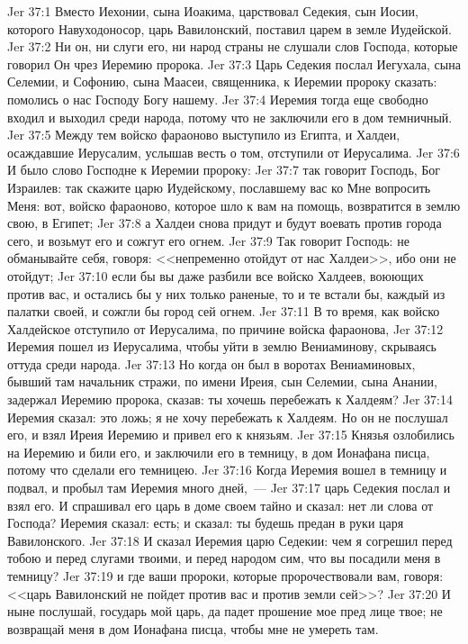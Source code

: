 \vs Jer 37:1 Вместо Иехонии, сына Иоакима, царствовал Седекия, сын Иосии, которого Навуходоносор, царь Вавилонский, поставил царем в земле Иудейской.
\vs Jer 37:2 Ни он, ни слуги его, ни народ страны не слушали слов Господа, которые говорил Он чрез Иеремию пророка.
\vs Jer 37:3 Царь Седекия послал Иегухала, сына Селемии, и Софонию, сына Маасеи, священника, к Иеремии пророку сказать: помолись о нас Господу Богу нашему.
\vs Jer 37:4 Иеремия тогда еще свободно входил и выходил среди народа, потому что не заключили его в дом темничный.
\vs Jer 37:5 Между тем войско фараоново выступило из Египта, и Халдеи, осаждавшие Иерусалим, услышав весть о том, отступили от Иерусалима.
\vs Jer 37:6 И было слово Господне к Иеремии пророку:
\vs Jer 37:7 так говорит Господь, Бог Израилев: так скажите царю Иудейскому, пославшему вас ко Мне вопросить Меня: вот, войско фараоново, которое шло к вам на помощь, возвратится в землю свою, в Египет;
\vs Jer 37:8 а Халдеи снова придут и будут воевать против города сего, и возьмут его и сожгут его огнем.
\vs Jer 37:9 Так говорит Господь: не обманывайте себя, говоря: <<непременно отойдут от нас Халдеи>>, ибо они не отойдут;
\vs Jer 37:10 если бы вы даже разбили все войско Халдеев, воюющих против вас, и остались бы у них только раненые, то и те встали бы, каждый из палатки своей, и сожгли бы город сей огнем.
\rsbpar\vs Jer 37:11 В то время, как войско Халдейское отступило от Иерусалима, по причине войска фараонова,
\vs Jer 37:12 Иеремия пошел из Иерусалима, чтобы уйти в землю Вениаминову, скрываясь оттуда среди народа.
\vs Jer 37:13 Но когда он был в воротах Вениаминовых, бывший там начальник стражи, по имени Иреия, сын Селемии, сына Анании, задержал Иеремию пророка, сказав: ты хочешь перебежать к Халдеям?
\vs Jer 37:14 Иеремия сказал: это ложь; я не хочу перебежать к Халдеям. Но он не послушал его, и взял Иреия Иеремию и привел его к князьям.
\vs Jer 37:15 Князья озлобились на Иеремию и били его, и заключили его в темницу, в дом Ионафана писца, потому что сделали его темницею.
\vs Jer 37:16 Когда Иеремия вошел в темницу и подвал, и пробыл там Иеремия много дней,~---
\vs Jer 37:17 царь Седекия послал и взял его. И спрашивал его царь в доме своем тайно и сказал: нет ли слова от Господа? Иеремия сказал: есть; и сказал: ты будешь предан в руки царя Вавилонского.
\vs Jer 37:18 И сказал Иеремия царю Седекии: чем я согрешил перед тобою и перед слугами твоими, и перед народом сим, что вы посадили меня в темницу?
\vs Jer 37:19 и где ваши пророки, которые пророчествовали вам, говоря: <<царь Вавилонский не пойдет против вас и против земли сей>>?
\vs Jer 37:20 И ныне послушай, государь мой царь, да падет прошение мое пред лице твое; не возвращай меня в дом Ионафана писца, чтобы мне не умереть там.
